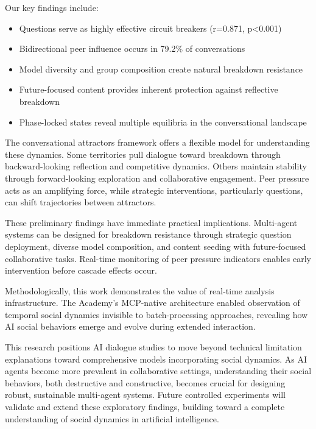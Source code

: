\documentclass[11pt,letterpaper]{article}
\newcommand{\theacademy}{The Academy}
\newcommand{\exponedataBidirectionalPercentage}{79.2\%}
\newcommand{\exponedataQuestionCorrelation}{0.871}
\newcommand{\exponedataQuestionPValue}{p<0.001}
\begin{document}
Our key findings include:
\begin{itemize}
    \item Questions serve as highly effective circuit breakers (r=\exponedataQuestionCorrelation{}, \exponedataQuestionPValue{})
    \item Bidirectional peer influence occurs in \exponedataBidirectionalPercentage{} of conversations
    \item Model diversity and group composition create natural breakdown resistance
    \item Future-focused content provides inherent protection against reflective breakdown
    \item Phase-locked states reveal multiple equilibria in the conversational landscape
\end{itemize}

The conversational attractors framework offers a flexible model for understanding these dynamics. Some territories pull dialogue toward breakdown through backward-looking reflection and competitive dynamics. Others maintain stability through forward-looking exploration and collaborative engagement. Peer pressure acts as an amplifying force, while strategic interventions, particularly questions, can shift trajectories between attractors.

These preliminary findings have immediate practical implications. Multi-agent systems can be designed for breakdown resistance through strategic question deployment, diverse model composition, and content seeding with future-focused collaborative tasks. Real-time monitoring of peer pressure indicators enables early intervention before cascade effects occur.

Methodologically, this work demonstrates the value of real-time analysis infrastructure. \theacademy{}'s MCP-native architecture enabled observation of temporal social dynamics invisible to batch-processing approaches, revealing how AI social behaviors emerge and evolve during extended interaction.

This research positions AI dialogue studies to move beyond technical limitation explanations toward comprehensive models incorporating social dynamics. As AI agents become more prevalent in collaborative settings, understanding their social behaviors, both destructive and constructive, becomes crucial for designing robust, sustainable multi-agent systems. Future controlled experiments will validate and extend these exploratory findings, building toward a complete understanding of social dynamics in artificial intelligence.
\end{document}
